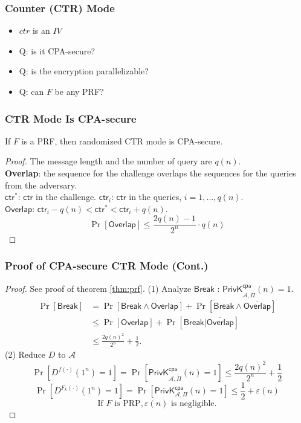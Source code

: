 \begin{frame}\frametitle{Counter (CTR) Mode}
\begin{figure}
\begin{center}

\end{center}
\end{figure}
\begin{itemize}
\item $ctr$ is an $IV$
\item \alert{Q: is it CPA-secure?}
\item \alert{Q: is the encryption parallelizable?}
\item \alert{Q: can $F$ be any PRF?}\end{itemize}
\end{frame}
\begin{frame}\frametitle{CTR Mode Is CPA-secure}
\begin{theorem}
If $F$ is a PRF, then randomized CTR mode is CPA-secure.
\end{theorem}
\begin{proof}
The message length and the number of query are $q(n)$. \\
\textbf{Overlap}: the sequence for the challenge overlaps the sequences for the queries from the adversary.\\
$\mathsf{ctr}^*$: $\mathsf{ctr}$ in the challenge. $\mathsf{ctr}_i$: $\mathsf{ctr}$ in the queries, $i = 1,\dots,q(n)$.\\
$\mathsf{Overlap}$: $\mathsf{ctr}_i-q(n) < \mathsf{ctr}^* < \mathsf{ctr}_i + q(n)$.\\
\[\Pr[\mathsf{Overlap}] \le \frac{2q(n)-1}{2^n} \cdot q(n)\]
\end{proof}
\end{frame}
\begin{frame}\frametitle{Proof of CPA-secure CTR Mode (Cont.)}
\begin{proof}
See proof of theorem \ref{thm:prf}.
(1) Analyze $\mathsf{Break}$ : $\mathsf{PrivK}_{\mathcal{A},\tilde{\Pi}}^{\mathsf{cpa}}(n)=1$.
\[
\begin{split}
	\Pr[\mathsf{Break}] & =\Pr[\mathsf{Break} \land \mathsf{Overlap}] + \Pr[\mathsf{Break} \land \overline{\mathsf{Overlap}}] \\
	&\le \Pr[\mathsf{Overlap}] + \Pr[\mathsf{Break} | \overline{\mathsf{Overlap}}] \\
	&\le \frac{2q(n)^2}{2^n} + \frac{1}{2}.
\end{split}
\]
(2) Reduce $D$ to $\mathcal{A}$
\[ \Pr[D^{f(\cdot)}(1^n)=1]=\Pr[\mathsf{PrivK}_{\mathcal{A},\tilde{\Pi}}^{\mathsf{cpa}}(n)=1] \le \frac{2q(n)^2}{2^n} + \frac{1}{2}
\]
\[\Pr[D^{F_k(\cdot)}(1^n)=1]=\Pr[\mathsf{PrivK}_{\mathcal{A},\Pi}^{\mathsf{cpa}}(n)=1] \le \frac{1}{2} + \varepsilon(n)
\]
\[ \text{If } F \text{ is PRP}, \varepsilon(n) \text{ is negligible.}
\]
\end{proof}
\end{frame}
